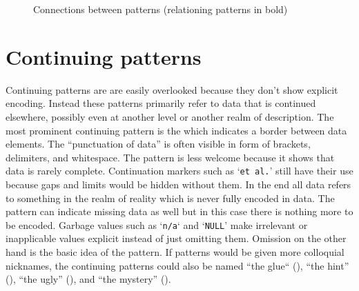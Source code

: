 \vfill
\begin{figure}[h]
\centering
{}
\caption{Connections between patterns (relationing patterns in bold)}
\label{fig:relpatterns}
\end{figure}
\vfill

\clearpage


\clearpage
\section{Continuing patterns}
\label{sec:continuing-patterns}

Continuing patterns are are easily overlooked because they don't show explicit
encoding. Instead these patterns primarily refer to data that is continued
elsewhere, possibly even at another level or another realm of description. The
most prominent continuing pattern is the  which indicates a
border between data elements. The ``punctuation of data'' is often visible in
form of brackets, delimiters, and whitespace. The  pattern is
less welcome because it shows that data is rarely complete. Continuation
markers such as `\verb|et al.|' still have their use because gaps and limits
would be hidden without them. In the end all data refers to something in the
realm of reality which is never fully encoded in data. The 
pattern can indicate missing data as well but in this case there is nothing
more to be encoded. Garbage values such as `\verb|n/a|` and `\verb|NULL|' make
irrelevant or inapplicable values explicit instead of just omitting them.
Omission on the other hand is the basic idea of the  pattern.  If
patterns would be given more colloquial nicknames, the continuing patterns
could also be named ``the glue`` (), ``the hint''
(), ``the ugly'' (), and ``the mystery''
().


\clearpage
